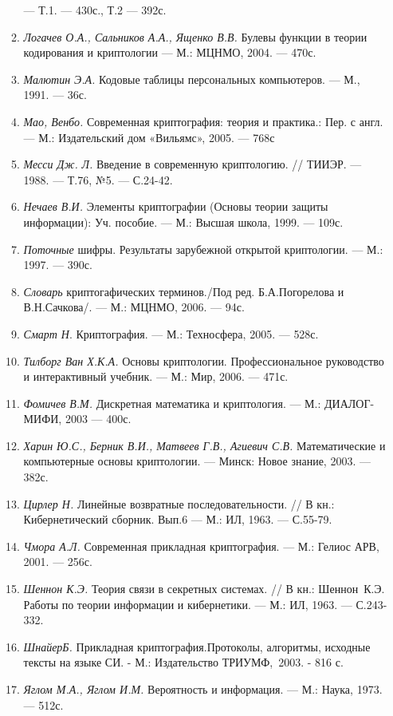 \begin{enumerate}
\begin{enumerate}
---  Т.1. --- 430с., Т.2 --- 392с.
\item \textit{ }\textit{Логачев О.А., Сальников А.А., Ященко В.В.} Булевы
функции в теории кодирования и криптологии --- М.: МЦНМО, 2004. --- 470с.
\item \textit{ }\textit{Малютин Э.А.} Кодовые таблицы персональных компьютеров.
--- М., 1991. --- 36с.
\item \textit{ Мао, Венбо. }Современная  криптография: теория и практика.: Пер.
с англ. --- М.: Издательский дом «Вильямс»,  2005. --- 768с
\item \textit{ }\textit{Месси Дж.}\textit{ }\textit{Л.} Введение в современную
криптологию. // ТИИЭР. --- 1988. --- Т.76, №5. --- С.24-42.
\item \textit{ Н}\textit{ечаев В.И.} Элементы криптографии (Основы теории защиты
информации):  Уч.  пособие. --- М.: Высшая школа, 1999. --- 109с.
\item \textit{ }\textit{Поточные} шифры. Результаты зарубежной открытой
криптологии. --- М.: 1997. ---  390с. 
\item \textit{Словарь} криптогафических терминов./Под ред. Б.А.Погорелова и
В.Н.Сачкова/. --- М.: МЦНМО, 2006. --- 94с.
\item \textit{\textcolor[rgb]{0.2,0.2,0.2}{Смарт
Н}}\textcolor[rgb]{0.2,0.2,0.2}{. Криптография. }---
\textcolor[rgb]{0.2,0.2,0.2}{ М.: Техносфера, 2005. }---
\textcolor[rgb]{0.2,0.2,0.2}{ 528с.}
\item \textit{Тилборг Ван Х.К.А.} Основы криптологии. Профессиональное
руководство и интерактивный учебник. ---  М.: Мир, 2006. --- 471с.
\item \textit{Фомичев В.М.} Дискретная математика и криптология. --- М.:
ДИАЛОГ-МИФИ, 2003 --- 400с.
\item \textit{Харин Ю.С., Берник В.И., Матвеев Г.В., Агиевич С.В.
}Математические и компьютерные основы криптологии. --- Минск: Новое знание, 2003.
--- 382с.
\item \textit{Цирлер Н.} Линейные возвратные последовательности. // В кн.:
Кибернетический сборник. Вып.6 --- М.: ИЛ, 1963. --- С.55-79.
\item \textit{Чмора А.Л.} Современная прикладная криптография. ---  М.: Гелиос
АРВ,  2001. --- 256с.
\item \textit{Шеннон К.Э.} Теория связи в секретных системах. // В кн.:
Шеннон~К.Э. Работы по теории информации и кибернетики. --- М.: ИЛ, 1963. ---
С.243-332.
\item {\color[rgb]{0.2,0.2,0.2}
\textit{ШнайерБ. }Прикладная криптография.Протоколы, алгоритмы,\newline
исходные тексты на языке СИ. - М.: Издательство ТРИУМФ,~2003. - 816 с\textsf{.}}
\item \textit{Яглом М.А., Яглом И.М.} Вероятность и информация. --- М.: Наука,
1973. --- 512с. 
\end{enumerate}
\end{enumerate}

